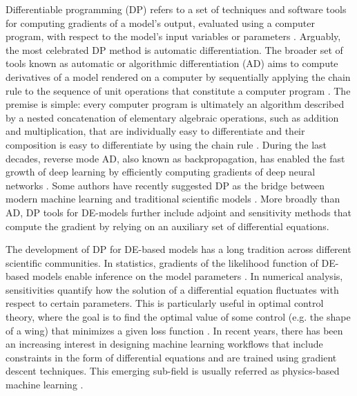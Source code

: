 Differentiable programming (DP) refers to a set of techniques and software tools for computing gradients of a model's output, evaluated using a computer program, with respect to the model's input variables or parameters \cite{Shen_diff_modelling, Innes_Zygote, blondel2024elements}.
Arguably, the most celebrated DP method is automatic differentiation.
The broader set of tools known as automatic or algorithmic differentiation (AD) aims to compute derivatives of a model rendered on a computer by sequentially applying the chain rule to the sequence of unit operations that constitute a computer program \cite{Griewank:2008kh, Naumann.2011}. 
The premise is simple: every computer program is ultimately an algorithm described by a nested concatenation of elementary algebraic operations, such as addition and multiplication, that are individually easy to differentiate and their composition is easy to differentiate by using the chain rule \cite{Giering:1998in}. 
During the last decades, reverse mode AD, also known as backpropagation, has enabled the fast growth of deep learning by efficiently computing gradients of deep neural networks \cite{griewank2012invented}.
Some authors have recently suggested DP as the bridge between modern machine learning and traditional scientific models \cite{Ramsundar_Krishnamurthy_Viswanathan_2021, Shen_diff_modelling, Gelbrecht-differential-programming-Earth, rackauckas2021generalized}. 
More broadly than AD, DP tools for DE-models further include adjoint and sensitivity methods that compute the gradient by relying on an auxiliary set of differential equations.


The development of DP for DE-based models has a long tradition across different scientific communities.
In statistics, gradients of the likelihood function of DE-based models enable inference on the model parameters \cite{ramsay2017dynamic}. 
In numerical analysis, sensitivities quantify how the solution of a differential equation fluctuates with respect to certain parameters. 
This is particularly useful in optimal control theory, where the goal is to find the optimal value of some control (e.g. the shape of a wing) that minimizes a given loss function \cite{Giles_Pierce_2000}. 
In recent years, there has been an increasing interest in designing machine learning workflows that include constraints in the form of differential equations and are trained using gradient descent techniques.
This emerging sub-field is usually referred as physics-based machine learning \cite{Karniadakis_Kevrekidis_Lu_Perdikaris_Wang_Yang_2021, thuerey2021pbdl}.

